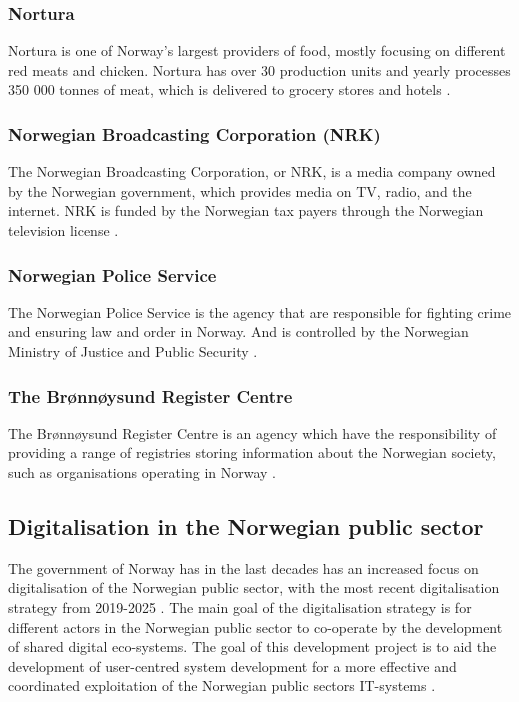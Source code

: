 \subsubsection{Nortura}
Nortura is one of Norway's largest providers of food, mostly focusing on different red meats and chicken. Nortura has over 30 production units and yearly processes 350 000 tonnes of meat, which is delivered to grocery stores and hotels \cite{nortura_2023}.

\subsubsection{Norwegian Broadcasting Corporation (NRK)}
The Norwegian Broadcasting Corporation, or NRK, is a media company owned by the Norwegian government, which provides media on TV, radio, and the internet. NRK is funded by the Norwegian tax payers through the Norwegian television license \cite{nrk_wiki_2023}.

\subsubsection{Norwegian Police Service}
The Norwegian Police Service is the agency that are responsible for fighting crime and ensuring law and order in Norway. And is controlled by the Norwegian Ministry of Justice and Public Security \cite{politiet_wiki_2023}.

\subsubsection{The Brønnøysund Register Centre}
The Brønnøysund Register Centre is an agency which have the responsibility of providing a range of registries storing information about the Norwegian society, such as organisations operating in Norway \cite{brønnøysundregistrene_wiki_2023}.

\subsection{Digitalisation in the Norwegian public sector}
The government of Norway has in the last decades has an increased focus on digitalisation of the Norwegian public sector, with the most recent digitalisation strategy from 2019-2025 \cite{r_2019}. The main goal of the digitalisation strategy is for different actors in the Norwegian public sector to co-operate by the development of shared digital eco-systems. The goal of this development project is to aid the development of user-centred system development for a more effective and coordinated exploitation of the Norwegian public sectors IT-systems \cite{r_2019}.

